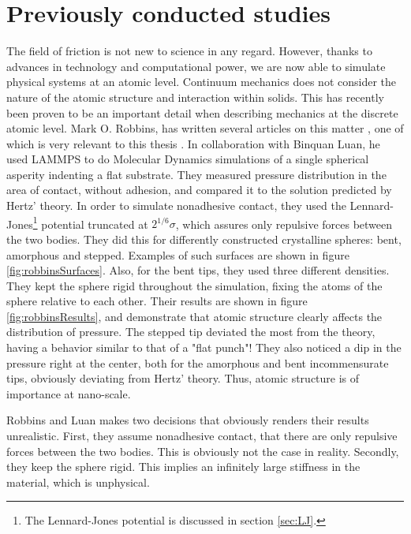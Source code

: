 \documentclass[twoside,english]{uiofysmaster}
\begin{document}
\section{Previously conducted studies}
The field of friction is not new to science in any regard. 
However, thanks to advances in technology and computational power, we are now able to simulate physical systems at an atomic level. 
Continuum mechanics does not consider the nature of the atomic structure and interaction within solids. 
This has recently been proven to be an important detail when describing mechanics at the discrete atomic level. 
Mark O. Robbins, has written several articles on this matter \cite{Robbins2005,RobbinsSingleAsperity,RobbinsSimpleMicroscopicTheroyOfAmontonsLawsOfFriction, RobbinsDefiningContactAtTheAtomicScale},  
one of which is very relevant to this thesis \cite{RobbinsSingleAsperity}. 
In collaboration with Binquan Luan, he used LAMMPS to do Molecular Dynamics simulations of a single spherical asperity indenting a flat substrate. 
They measured pressure distribution in the area of contact, without adhesion, and compared it to the solution predicted by Hertz' theory. 
In order to simulate nonadhesive contact, they used the Lennard-Jones\footnote{The Lennard-Jones potential is discussed in section \ref{sec:LJ}.} potential truncated at $2^{1/6}\sigma$, which assures only repulsive forces between the two bodies.
They did this for differently constructed crystalline spheres: bent, amorphous and
stepped. 
Examples of such surfaces are shown in figure \ref{fig:robbinsSurfaces}.
Also, for the bent tips, they used three different densities. 
They kept the sphere rigid throughout the simulation, fixing the atoms of the sphere relative to each other. 
Their results are shown in figure \ref{fig:robbinsResults}, and demonstrate that atomic structure clearly affects the distribution of pressure.
The stepped tip deviated the most from the theory, having a behavior similar to that of a "flat punch"!  
They also noticed a dip in the pressure right at the center, both for the amorphous and bent incommensurate tips, obviously deviating from Hertz' theory.
Thus, atomic structure is of importance at nano-scale.



Robbins and Luan makes two decisions that obviously renders their results unrealistic. 
First, they assume nonadhesive contact, that there are only repulsive forces between the two bodies. 
This is obviously not the case in reality.
Secondly, they keep the sphere rigid. 
This implies an infinitely large stiffness in the material, which is unphysical. 
\end{document}
